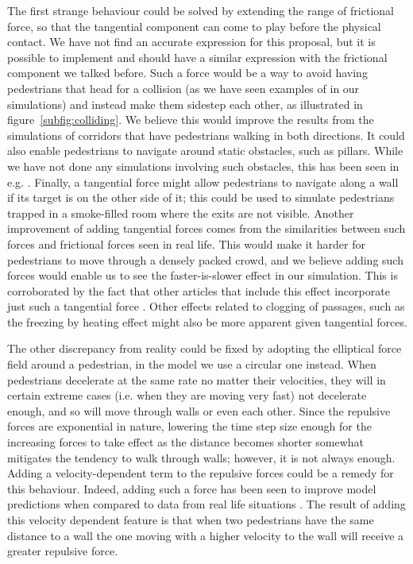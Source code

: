 The first strange behaviour could be solved by extending the range of 
frictional force, so that the tangential component can come to play before 
the physical contact. We have not find an accurate expression for this 
proposal, but it is possible to implement and should have a similar expression 
with the frictional component we talked before.
Such a force would be a way to avoid having pedestrians that 
head for a collision (as we have seen examples of in our simulations) 
and instead make them sidestep each other, as illustrated in 
figure~\ref{subfig:colliding}. We believe this would improve the results from 
the simulations of corridors that have pedestrians walking in both directions. 
It could also enable pedestrians to navigate around static obstacles, such as 
pillars. While we have not done any simulations involving such obstacles, this 
has been seen in e.g. \cite{tang}. Finally, a tangential force might allow 
pedestrians to navigate along a wall if its target is on the other side of it; 
this could be used to simulate pedestrians trapped in a smoke-filled room 
where the exits are not visible.
Another improvement of adding tangential forces comes from the similarities 
between such forces and frictional forces seen in real life. This would make 
it harder for pedestrians to move through a densely packed crowd, and we 
believe adding such forces would enable us to see the faster-is-slower effect 
in our simulation. This is corroborated by the fact that other articles that 
include this effect incorporate just such a tangential force \cite{helbing00}. 
Other effects related to clogging of passages, such as the freezing by heating 
effect might also be more apparent given tangential forces.

The other discrepancy from reality could be fixed by adopting the elliptical 
force field around a pedestrian, in the model we use a circular one instead. 
When pedestrians decelerate at the same rate no matter their velocities, they 
will in certain extreme cases (i.e. when they are moving very fast) not 
decelerate enough, and so will move through walls or even each other. Since 
the repulsive forces are exponential in nature, lowering the time step size 
enough for the increasing forces to take effect as the distance becomes 
shorter somewhat mitigates the tendency to walk through walls; however, it is 
not always enough. Adding a velocity-dependent term to the repulsive forces 
could be a remedy for this behaviour. Indeed, adding such a force has been 
seen to improve model predictions when compared to data from real life 
situations \cite{ABconstant}.
The result of adding this velocity dependent feature is that when two pedestrians 
have the same distance to a wall the one moving with a 
higher velocity to the wall will receive a greater repulsive force.


